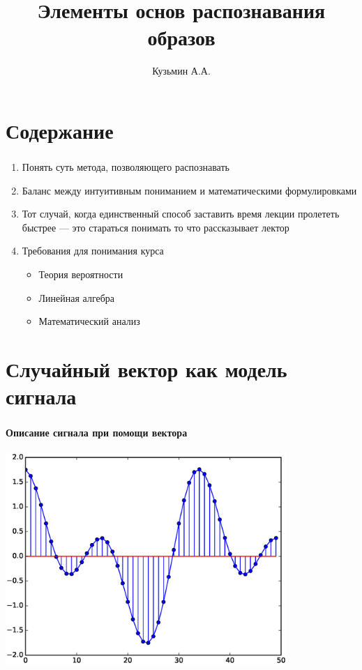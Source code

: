 \documentclass{beamer}
\title{Элементы основ распознавания образов}
\author{Кузьмин А.А.}
\institute[]{\url{http://rfe.bsu.by/}}
\begin{document}
\begin{frame}
  \maketitle
\end{frame}

\section{Содержание}

\begin{frame} \label{cont}
  \frametitle{\insertsection}
  
  \begin{enumerate}
    \item Понять суть метода, позволяющего распознавать \pause
  \item Баланс между интуитивным пониманием и математическими формулировками \pause
  \item Тот случай, когда единственный способ заставить время лекции пролететь быстрее --- это стараться понимать то что рассказывает лектор \pause
  \item Требования для понимания курса \pause
    \begin{itemize}
      \item Теория вероятности
      \item Линейная алгебра
      \item Математический анализ
    \end{itemize}
  \end{enumerate}
\end{frame}

\section{Случайный вектор как модель сигнала}

\begin{frame}
  \frametitle{\insertsection}
  \framesubtitle{Описание сигнала при помощи вектора}
  \includegraphics[width=0.8\textwidth]{tovec.eps}
\end{frame}
\end{document}
